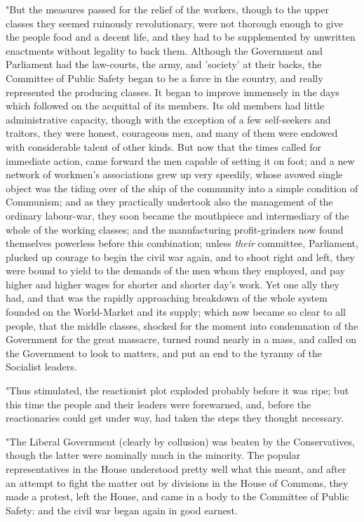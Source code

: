 "But the measures passed for the relief of the workers, though to the
upper classes they seemed ruinously revolutionary, were not thorough
enough to give the people food and a decent life, and they had to be
supplemented by unwritten enactments without legality to back them.
Although the Government and Parliament had the law-courts, the army, and
'society' at their backs, the Committee of Public Safety began to be a
force in the country, and really represented the producing classes. It
began to improve immensely in the days which followed on the acquittal
of its members. Its old members had little administrative capacity,
though with the exception of a few self-seekers and traitors, they were
honest, courageous men, and many of them were endowed with considerable
talent of other kinds. But now that the times called for immediate
action, came forward the men capable of setting it on foot; and a new
network of workmen's associations grew up very speedily, whose avowed
single object was the tiding over of the ship of the community into a
simple condition of Communism; and as they practically undertook also
the management of the ordinary labour-war, they soon became the
mouthpiece and intermediary of the whole of the working classes; and the
manufacturing profit-grinders now found themselves powerless before this
combination; unless \emph{their} committee, Parliament, plucked up
courage to begin the civil war again, and to shoot right and left, they
were bound to yield to the demands of the men whom they employed, and
pay higher and higher wages for shorter and shorter day's work. Yet one
ally they had, and that was the rapidly approaching breakdown of the
whole system founded on the World-Market and its supply; which now
became so clear to all people, that the middle classes, shocked for the
moment into condemnation of the Government for the great massacre,
turned round nearly in a mass, and called on the Government to look to
matters, and put an end to the tyranny of the Socialist leaders.

"Thus stimulated, the reactionist plot exploded probably before it was
ripe; but this time the people and their leaders were forewarned, and,
before the reactionaries could get under way, had taken the steps they
thought necessary.

"The Liberal Government (clearly by collusion) was beaten by the
Conservatives, though the latter were nominally much in the minority.
The popular representatives in the House understood pretty well what
this meant, and after an attempt to fight the matter out by divisions in
the House of Commons, they made a protest, left the House, and came in a
body to the Committee of Public Safety: and the civil war began again in
good earnest.

